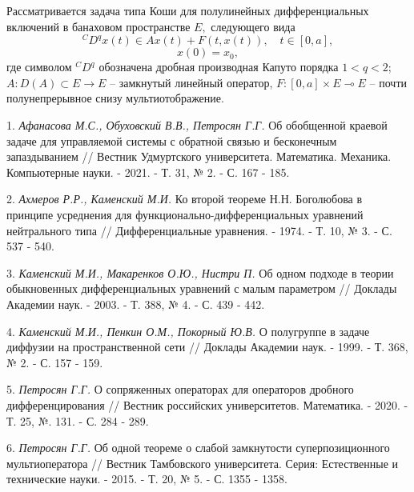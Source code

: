 \documentclass{vzmsthesis}
\begin{document}

\vzmscaption

Рассматривается задача типа Коши для полулинейных дифференциальных включений в банаховом пространстве $E,$ следующего вида
$$
  ^CD^q x\left( t\right)\in Ax(t)+F(t,x(t)),\quad t \in \left[0,a\right],  
$$
$$
x(0)=x_0,
$$
где символом $^{C}D^{q}$ обозначена дробная производная Капуто порядка  $1<q<2$; $A:D(A)\subset E \rightarrow E$ -- замкнутый линейный оператор, $F: [0,a] \times  E \multimap E$ -- почти полунепрерывное снизу мультиотображение.


\litlist

1. {\it Афанасова М.С., Обуховский В.В., Петросян Г.Г.} Об обобщенной краевой задаче для управляемой системы с обратной связью и бесконечным запаздыванием // Вестник Удмуртского университета. Математика. Механика. Компьютерные науки. - 2021. - Т. 31, № 2. -  С. 167 - 185.

2. {\it Ахмеров Р.Р., Каменский М.И.}  Ко второй теореме Н.Н. Боголюбова в принципе усреднения для функционально-дифференциальных уравнений нейтрального типа // Дифференциальные уравнения. - 1974. - Т. 10, № 3. - С. 537 - 540.

3. {\it Каменский М.И., Макаренков О.Ю., Нистри П.} Об одном подходе в теории обыкновенных дифференциальных уравнений с малым параметром // Доклады Академии наук. - 2003. - Т. 388, № 4. - С. 439 - 442.

4. {\it Каменский М.И., Пенкин О.М., Покорный Ю.В.} О полугруппе в задаче диффузии на пространственной сети // Доклады Академии наук. - 1999. - Т. 368, № 2. - С. 157 - 159.

5.	{\it Петросян Г.Г.} О сопряженных операторах для операторов дробного дифференцирования // Вестник российских университетов. Математика. - 2020. - Т. 25, №. 131. - С. 284 - 289.

6. {\it Петросян Г.Г.}  Об одной теореме о слабой замкнутости суперпозиционного мультиоператора // Вестник Тамбовского университета. Серия: Естественные и технические науки. - 2015. - Т. 20, № 5. - С. 1355 - 1358.
\end{document}
